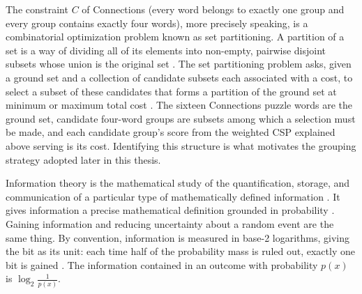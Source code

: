 The constraint $C$ of Connections (every word belongs to exactly one group and every group contains exactly four words), more precisely speaking, is a combinatorial optimization problem known as set partitioning. A partition of a set is a way of dividing all of its elements into non-empty, pairwise disjoint subsets whose union is the original set \cite{PartitionSet2026}. The set partitioning problem asks, given a ground set and a collection of candidate subsets each associated with a cost, to select a subset of these candidates that forms a partition of the ground set at minimum or maximum total cost \cite{muellerSolvingSetPartitioning1998}. The sixteen Connections puzzle words are the ground set, candidate four-word groups are subsets among which a selection must be made, and each candidate group's score from the weighted \ac{CSP} explained above serving is its cost. Identifying this structure is what motivates the grouping strategy adopted later in this thesis.


Information theory is the mathematical study of the quantification, storage, and communication of a particular type of mathematically defined information \cite{InformationTheory2026}. It gives information a precise mathematical definition grounded in probability \cite{shannonMathematicalTheoryCommunication1948}. Gaining information and reducing uncertainty about a random event are the same thing. By convention, information is measured in base-2 logarithms, giving the bit as its unit: each time half of the probability mass is ruled out, exactly one bit is gained \cite{pinkardVisualIntroductionInformation2026}. The information contained in an outcome with probability $p(x)$ is $\log_2 \frac{1}{p(x)}$.

